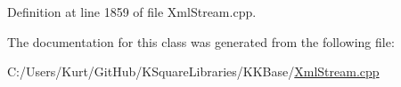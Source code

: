 Definition at line 1859 of file Xml\+Stream.\+cpp.



The documentation for this class was generated from the following file\+:\begin{DoxyCompactItemize}
\item 
C\+:/\+Users/\+Kurt/\+Git\+Hub/\+K\+Square\+Libraries/\+K\+K\+Base/\hyperlink{_xml_stream_8cpp}{Xml\+Stream.\+cpp}\end{DoxyCompactItemize}
